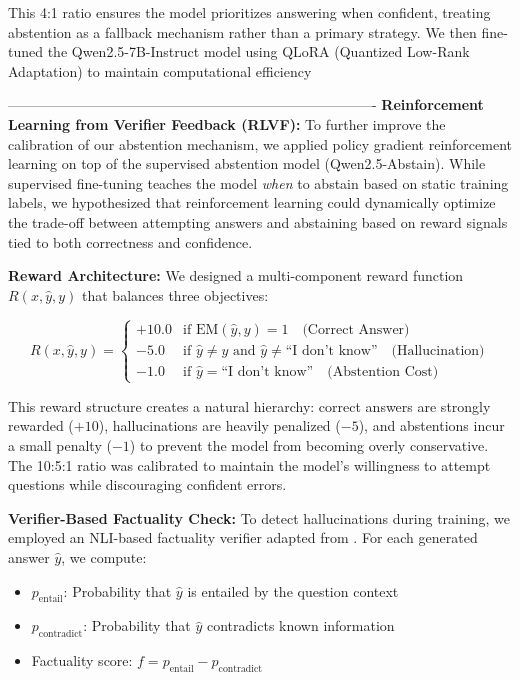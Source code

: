 \documentclass{article}
\begin{document}
This 4:1 ratio ensures the model prioritizes answering when confident, treating abstention as a fallback mechanism rather than a primary strategy. We then fine-tuned the Qwen2.5-7B-Instruct model using QLoRA (Quantized Low-Rank Adaptation) to maintain computational efficiency

-------------------------------------------------------------------------------\newline
\textbf{Reinforcement Learning from Verifier Feedback (RLVF):} To further improve the calibration of our abstention mechanism, we applied policy gradient reinforcement learning on top of the supervised abstention model (Qwen2.5-Abstain). While supervised fine-tuning teaches the model \textit{when} to abstain based on static training labels, we hypothesized that reinforcement learning could dynamically optimize the trade-off between attempting answers and abstaining based on reward signals tied to both correctness and confidence.

\textbf{Reward Architecture:} We designed a multi-component reward function $R(x, \hat{y}, y)$ that balances three objectives:

\begin{equation}
R(x, \hat{y}, y) = \begin{cases}
+10.0 & \text{if } \text{EM}(\hat{y}, y) = 1 \quad \text{(Correct Answer)} \\
-5.0 & \text{if } \hat{y} \neq y \text{ and } \hat{y} \neq \text{``I don't know''} \quad \text{(Hallucination)} \\
-1.0 & \text{if } \hat{y} = \text{``I don't know''} \quad \text{(Abstention Cost)}
\end{cases}
\end{equation}

This reward structure creates a natural hierarchy: correct answers are strongly rewarded ($+10$), hallucinations are heavily penalized ($-5$), and abstentions incur a small penalty ($-1$) to prevent the model from becoming overly conservative. The 10:5:1 ratio was calibrated to maintain the model's willingness to attempt questions while discouraging confident errors.

\textbf{Verifier-Based Factuality Check:} To detect hallucinations during training, we employed an NLI-based factuality verifier adapted from \cite{factualityverifier}. For each generated answer $\hat{y}$, we compute:
\begin{itemize}
    \item $p_{\text{entail}}$: Probability that $\hat{y}$ is entailed by the question context
    \item $p_{\text{contradict}}$: Probability that $\hat{y}$ contradicts known information
    \item Factuality score: $f = p_{\text{entail}} - p_{\text{contradict}}$
\end{itemize}
\end{document}
